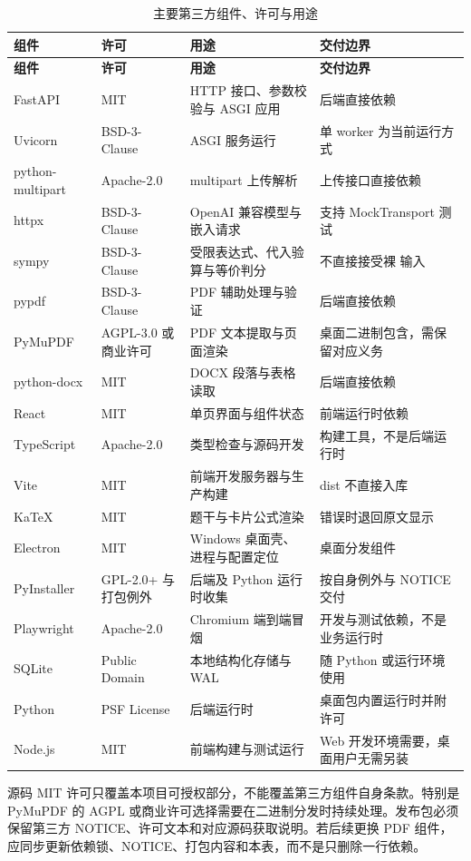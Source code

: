\begin{longtable}{@{}L{3.5cm}L{3.0cm}L{4.2cm}L{4.0cm}@{}}
\caption{主要第三方组件、许可与用途}\label{tab:dependencies}\\
\toprule
\textbf{组件} & \textbf{许可} & \textbf{用途} & \textbf{交付边界} \\
\midrule
\endfirsthead
\toprule
\textbf{组件} & \textbf{许可} & \textbf{用途} & \textbf{交付边界} \\
\midrule
\endhead
FastAPI & MIT & HTTP 接口、参数校验与 ASGI 应用 & 后端直接依赖 \\
Uvicorn & BSD-3-Clause & ASGI 服务运行 & 单 worker 为当前运行方式 \\
python-multipart & Apache-2.0 & multipart 上传解析 & 上传接口直接依赖 \\
httpx & BSD-3-Clause & OpenAI 兼容模型与嵌入请求 & 支持 MockTransport 测试 \\
sympy & BSD-3-Clause & 受限表达式、代入验算与等价判分 & 不直接接受裸  输入 \\
pypdf & BSD-3-Clause & PDF 辅助处理与验证 & 后端直接依赖 \\
PyMuPDF & AGPL-3.0 或商业许可 & PDF 文本提取与页面渲染 & 桌面二进制包含，需保留对应义务 \\
python-docx & MIT & DOCX 段落与表格读取 & 后端直接依赖 \\
React & MIT & 单页界面与组件状态 & 前端运行时依赖 \\
TypeScript & Apache-2.0 & 类型检查与源码开发 & 构建工具，不是后端运行时 \\
Vite & MIT & 前端开发服务器与生产构建 & dist 不直接入库 \\
KaTeX & MIT & 题干与卡片公式渲染 & 错误时退回原文显示 \\
Electron & MIT & Windows 桌面壳、进程与配置定位 & 桌面分发组件 \\
PyInstaller & GPL-2.0+ 与打包例外 & 后端及 Python 运行时收集 & 按自身例外与 NOTICE 交付 \\
Playwright & Apache-2.0 & Chromium 端到端冒烟 & 开发与测试依赖，不是业务运行时 \\
SQLite & Public Domain & 本地结构化存储与 WAL & 随 Python 或运行环境使用 \\
Python & PSF License & 后端运行时 & 桌面包内置运行时并附许可 \\
Node.js & MIT & 前端构建与测试运行 & Web 开发环境需要，桌面用户无需另装 \\
\bottomrule
\end{longtable}

源码 MIT 许可只覆盖本项目可授权部分，不能覆盖第三方组件自身条款。特别是 PyMuPDF 的 AGPL 或商业许可选择需要在二进制分发时持续处理。发布包必须保留第三方 NOTICE、许可文本和对应源码获取说明。若后续更换 PDF 组件，应同步更新依赖锁、NOTICE、打包内容和本表，而不是只删除一行依赖。
